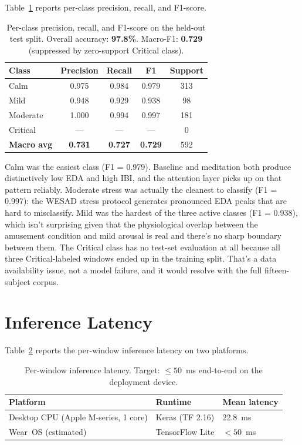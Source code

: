 Table~\ref{tab:perclass} reports per-class precision, recall, and
F1-score.

\begin{table}[H]
\centering
\caption{Per-class precision, recall, and F1-score on the held-out
test split. Overall accuracy: \textbf{97.8\%}. Macro-F1:
\textbf{0.729} (suppressed by zero-support Critical class).}
\label{tab:perclass}
\small
\begin{tabular}{lcccc}
\toprule
\textbf{Class} & \textbf{Precision} & \textbf{Recall} & \textbf{F1} &
\textbf{Support} \\
\midrule
Calm     & 0.975 & 0.984 & 0.979 & 313 \\
Mild     & 0.948 & 0.929 & 0.938 &  98 \\
Moderate & 1.000 & 0.994 & 0.997 & 181 \\
Critical & ---   & ---   & ---   &   0 \\
\midrule
\textbf{Macro avg} & \textbf{0.731} & \textbf{0.727} &
\textbf{0.729} & 592 \\
\bottomrule
\end{tabular}
\end{table}

Calm was the easiest class (F1 = 0.979). Baseline and meditation
both produce distinctively low EDA and high IBI, and the attention
layer picks up on that pattern reliably. Moderate stress was actually
the cleanest to classify (F1 = 0.997): the WESAD stress protocol
generates pronounced EDA peaks that are hard to misclassify. Mild
was the hardest of the three active classes (F1 = 0.938), which isn't
surprising given that the physiological overlap between the amusement
condition and mild arousal is real and there's no sharp boundary
between them. The Critical class has no test-set evaluation at all
because all three Critical-labeled windows ended up in the training
split. That's a data availability issue, not a model failure, and
it would resolve with the full fifteen-subject corpus.

\section{Inference Latency}
\label{sec:r-latency}

Table~\ref{tab:latency} reports the per-window inference latency on
two platforms.

\begin{table}[H]
\centering
\caption{Per-window inference latency. Target:
$\le 50$~ms end-to-end on the deployment device.}
\label{tab:latency}
\small
\begin{tabular}{lll}
\toprule
\textbf{Platform} & \textbf{Runtime} & \textbf{Mean latency} \\
\midrule
Desktop CPU (Apple M-series, 1 core) & Keras (TF 2.16) & 22.8~ms \\
Wear~OS (estimated)                   & TensorFlow Lite \citep{tflite2023} & $< 50$~ms \\
\bottomrule
\end{tabular}
\end{table}

